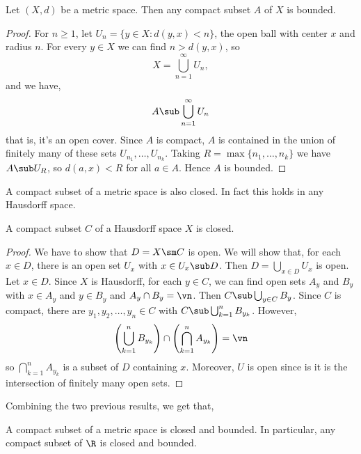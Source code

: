 \begin{nlemma}
  Let $(X, d)$ be a metric space. Then any compact subset $A$ of $X$ is bounded.
\end{nlemma}
\begin{proof}
  For $n \ge 1$, let $U_n = \{y \in X : d(y,x) < n\}$, the open ball with center $x$ and radius $n$. For every $y \in X$ we can find $n > d(y, x)$, so
  $$ X = \bigcup_{n=1}^\infty U_n, $$
  and we have,
  $$ A \sub \bigcup_{n=1}^\infty U_n $$
  that is, it's an open cover. Since $A$ is compact, $A$ is contained in the union of finitely many of these sets $U_{n_1}, \dots, U_{n_k}$. Taking $R = \max\{n_1, \dots, n_k\}$ we have $A \sub U_R$, so $d(a, x) < R$ for all $a \in A$. Hence $A$ is bounded.
\end{proof}

\noindent
A compact subset of a metric space is also closed. In fact this holds in any Hausdorff space.

\begin{nlemma}
  A compact subset $C$ of a Hausdorff space $X$ is closed.
\end{nlemma}
\begin{proof}
  We have to show that $D = X\sm C$ is open. We will show that, for each $x \in D$, there is an open set $U_x$ with $x \in U_x \sub D$. Then $D = \bigcup_{x \in D} U_x$ is open.\\

  \noindent
  Let $x \in D$. Since $X$ is Hausdorff, for each $y \in C$, we can find open sets $A_y$ and $B_y$ with $x \in A_y$ and $y \in B_y$ and $A_y \cap B_y = \vn$. Then $C \sub \bigcup_{y \in C} B_y$. Since $C$ is compact, there are $y_1, y_2, \dots, y_n \in C$ with $C \sub \bigcup_{k=1}^n B_{y_k}$. However,
  $$ \left( \bigcup_{k=1}^n B_{y_k} \right) \cap \left( \bigcap_{k=1}^n A_{y_k} \right) = \vn $$
  so $\bigcap_{k=1}^n A_{y_k}$ is a subset of $D$ containing $x$. Moreover, $U$ is open since is it is the intersection of finitely many open sets.
\end{proof}

\noindent
Combining the two previous results, we get that,
\begin{ncor}
  A compact subset of a metric space is closed and bounded. In particular, any compact subset of $\R$ is closed and bounded.
\end{ncor}